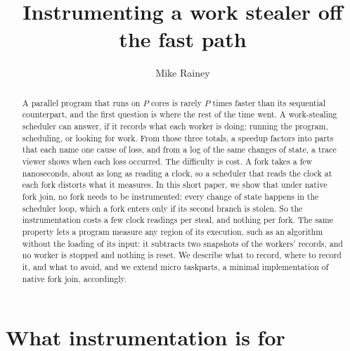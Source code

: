 \documentclass[sigplan,nonacm]{acmart}
\title{Instrumenting a work stealer off the fast path}
\author{Mike Rainey}
\begin{document}
\begin{abstract}
A parallel program that runs on $P$ cores is rarely $P$ times faster
than its sequential counterpart, and the first question is where the
rest of the time went.
%
A work-stealing scheduler can answer, if it records what each worker
is doing: running the program, scheduling, or looking for work.
%
From those three totals, a speedup factors into parts that each name
one cause of loss, and from a log of the same changes of state, a trace
viewer shows when each loss occurred.
%
The difficulty is cost.
%
A fork takes a few nanoseconds, about as long as reading a clock, so a
scheduler that reads the clock at each fork distorts what it measures.
%
In this short paper, we show that under native fork join, no fork needs
to be instrumented: every change of state happens in the scheduler
loop, which a fork enters only if its second branch is stolen.
%
So the instrumentation costs a few clock readings per steal, and
nothing per fork.
%
The same property lets a program measure any region of its execution,
such as an algorithm without the loading of its input: it subtracts
two snapshots of the workers' records, and no worker is stopped and
nothing is reset.
%
We describe what to record, where to record it, and what to avoid, and
we extend micro taskparts, a minimal implementation of native fork
join, accordingly.
\end{abstract}

\maketitle

\section{What instrumentation is for}
\end{document}
